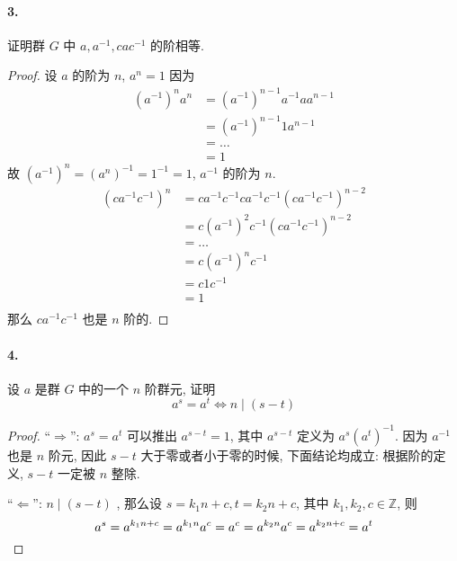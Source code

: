 \documentclass[12pt]{ctexart}
\theoremstyle{definition}
\theoremstyle{definition}
\theoremstyle{plain}
\theoremstyle{remark}
\begin{document}
\paragraph{3. }证明群 \(G\) 中 \(a , a ^{-1}, c a c ^{-1}\) 的阶相等. 
\begin{proof}
设 \(a \) 的阶为 \(n\), \(a ^{n} = 1\) 
因为 
\[
	\begin{aligned}
	(a^{-1} ) ^{n} a ^{n}  
	&  = (a ^{-1} ) ^{ n-1} a ^{-1} a a ^{n-1} \\ 
		& = ( a ^{-1} ) ^{n-1}  1 a ^{n-1} \\
	& = \dots \\
	& = 1 
	\end{aligned}
\]
故 \( (a ^{-1} ) ^{n} = ( a ^{n} ) ^{-1} = 1 ^{-1} = 1\), \(a ^{-1}\) 的阶为 \(n\). 
\[
\begin{aligned}
	(c a ^{-1} c ^{-1} ) ^{n}  
	& = c a ^{- 1} c  ^{-1} c a ^{-1} c ^{-1} ( c a ^{-1} c ^{-1} ) ^{n-2}  \\
	& = c (a ^{-1} )  ^{2} c ^{-1} (c a ^{-1} c ^{-1} ) ^{n-2} \\ 
	& = \dots \\
	& = c  ( a ^{-1} ) ^{n } c ^{-1} \\ 
	& = c  1 c ^{-1} \\ 
	& = 1 \\ 
\end{aligned}
\]
那么 \(c a^{-1} c ^{-1}\) 也是 \(n\) 阶的. 
\end{proof}

\paragraph{4. }设 \(a \) 是群 \(G\) 中的一个 \(n\) 阶群元, 证明
\[
	a ^{s} = a ^{t} \iff n \mid ( s -t ) 
\]
\begin{proof}
	``\( \Rightarrow \)'':  \(a ^{s} = a ^{t} \) 可以推出 \(a ^{ s -t}  =1 \), 其中 \(a ^{ s  - t}\) 定义为 \(a ^{ s} (a ^{t}) ^{-1}\). 
	因为 \(a ^ {-1} \) 也是 \(n\) 阶元, 因此 \(s - t\) 大于零或者小于零的时候, 下面结论均成立: 根据阶的定义, \(s -t\) 一定被 \(n\) 整除. 

	``\(\Leftarrow \)'':
	\(n \mid  ( s -t ) \) , 那么设 \( s = k _{1} n + c , t = k_{2} n + c\), 其中 \( k_{1} ,k_2 , c\in \mathbb{Z}\), 则 
	\[
	a ^{s} = a ^{k _{1}  n +c } = a ^{k_{1} n} a ^{c} = a ^{c} = a ^{k_{2} n } a ^{c} = a ^{k_{2}n + c } = a ^{t} \qedhere
	\]
\end{proof}
\end{document}
